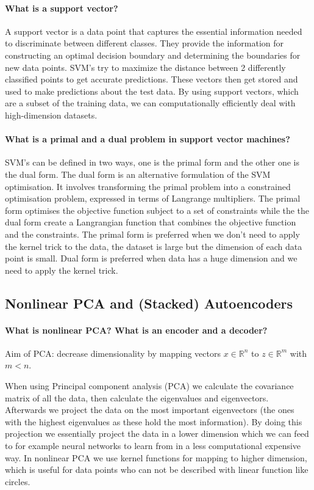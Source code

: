 \paragraph{What is a support vector?}

A support vector is a data point that captures the essential information needed to discriminate
between different classes. They provide the information for constructing an optimal decision
boundary and determining the boundaries for new data points. SVM's try to maximize the distance
between 2 differently classified points to get accurate predictions. These vectors then get stored and
used to make predictions about the test data. By using support vectors, which are a subset of the
training data, we can computationally efficiently deal with high-dimension datasets.

\paragraph{What is a primal and a dual problem in support vector machines?}

SVM's can be defined in two ways, one is the primal form and the other one is the dual form. The dual
form is an alternative formulation of the SVM optimisation. It involves transforming the primal
problem into a constrained optimisation problem, expressed in terms of Langrange multipliers. The
primal form optimises the objective function subject to a set of constraints while the the dual form
create a Langrangian function that combines the objective function and the constraints. The primal
form is preferred when we don't need to apply the kernel trick to the data, the dataset is large but the
dimension of each data point is small. Dual form is preferred when data has a huge dimension and
we need to apply the kernel trick.


\newpage
\subsection{Nonlinear PCA and (Stacked) Autoencoders}

\paragraph{What is nonlinear PCA? What is an encoder and a decoder?}

Aim of PCA: decrease dimensionality by mapping vectors $x \in \mathbb{R}^n$ to $z \in \mathbb{R}^m$ with $m < n$.

When using Principal component analysis (PCA) we calculate the covariance matrix of all the data,
then calculate the eigenvalues and eigenvectors. Afterwards we project the data on the most
important eigenvectors (the ones with the highest eigenvalues as these hold the most information).
By doing this projection we essentially project the data in a lower dimension which we can feed to for
example neural networks to learn from in a less computational expensive way.
In nonlinear PCA we use kernel functions for mapping to higher dimension, which is useful for data
points who can not be described with linear function like circles.

